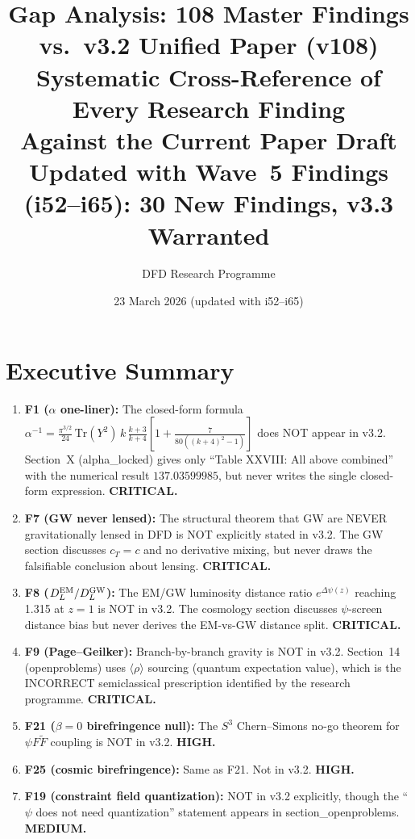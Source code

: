 \documentclass[11pt,a4paper]{article}
\title{\Huge Gap Analysis: 108 Master Findings\\vs.\ v3.2 Unified Paper (v108)\\[12pt]
\Large Systematic Cross-Reference of Every Research Finding\\
Against the Current Paper Draft\\[6pt]
\normalsize Updated with Wave~5 Findings (i52--i65): 30 New Findings, v3.3 Warranted}
\author{DFD Research Programme}
\date{23 March 2026 (updated with i52--i65)}
\begin{document}
\maketitle

\section{Executive Summary}

\begin{tcolorbox}[colback=red!5!white, colframe=red!60!black, title=Key Gaps Identified]
\begin{enumerate}
\item \textbf{F1 ($\alpha$ one-liner):} The closed-form formula $\alpha^{-1} = \frac{\pi^{3/2}}{24}\,\mathrm{Tr}(Y^2)\,k\,\frac{k+3}{k+4}[1 + \frac{7}{80((k+4)^2-1)}]$ does NOT appear in v3.2. Section~X (alpha\_locked) gives only ``Table XXVIII: All above combined'' with the numerical result $137.03599985$, but never writes the single closed-form expression. \textbf{CRITICAL.}

\item \textbf{F7 (GW never lensed):} The structural theorem that GW are NEVER gravitationally lensed in DFD is NOT explicitly stated in v3.2. The GW section discusses $c_T = c$ and no derivative mixing, but never draws the falsifiable conclusion about lensing. \textbf{CRITICAL.}

\item \textbf{F8 ($D_L^{\rm EM}/D_L^{\rm GW}$):} The EM/GW luminosity distance ratio $e^{\Delta\psi(z)}$ reaching 1.315 at $z=1$ is NOT in v3.2. The cosmology section discusses $\psi$-screen distance bias but never derives the EM-vs-GW distance split. \textbf{CRITICAL.}

\item \textbf{F9 (Page--Geilker):} Branch-by-branch gravity is NOT in v3.2. Section~14 (openproblems) uses $\langle\rho\rangle$ sourcing (quantum expectation value), which is the INCORRECT semiclassical prescription identified by the research programme. \textbf{CRITICAL.}

\item \textbf{F21 ($\beta=0$ birefringence null):} The $S^3$ Chern--Simons no-go theorem for $\psi F\tilde{F}$ coupling is NOT in v3.2. \textbf{HIGH.}

\item \textbf{F25 (cosmic birefringence):} Same as F21. Not in v3.2. \textbf{HIGH.}

\item \textbf{F19 (constraint field quantization):} NOT in v3.2 explicitly, though the ``$\psi$ does not need quantization'' statement appears in section\_openproblems. \textbf{MEDIUM.}
\end{enumerate}
\end{tcolorbox}
\end{document}
